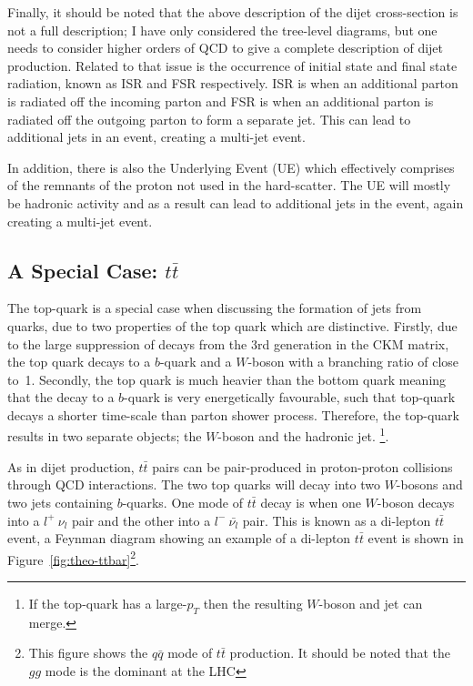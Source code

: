 Finally, it should be noted that the above description of the dijet cross-section is
not a full description; I have only considered the tree-level diagrams, 
but one needs to consider higher orders of QCD to give a complete description of dijet production.
Related to that issue is the occurrence of initial state and final state radiation, known as ISR and FSR respectively.
ISR is when an additional parton is radiated off the incoming parton and FSR is when an additional parton is radiated off the outgoing parton to form a separate jet.
This can lead to additional jets in an event, creating a multi-jet event.

In addition, there is also the Underlying Event (UE) which effectively comprises of the remnants of the proton not used in the hard-scatter.
The UE will mostly be hadronic activity and as a result can lead to additional jets in the event, again creating a multi-jet event.

\subsection{A Special Case: $t\bar{t}$}
\label{sec:theo-ttbar}

The top-quark is a special case when discussing the formation of jets from quarks,
due to two properties of the top quark which are distinctive.
Firstly, due to the large suppression of decays from the 3rd generation in the CKM matrix,
the top quark decays to a $b$-quark and a $W$-boson with a branching ratio of close to~1.
Secondly, the top quark is much heavier than the bottom quark
meaning that the decay to a $b$-quark is very energetically favourable,
such that top-quark decays a shorter time-scale than parton shower process.
Therefore, the top-quark results in two separate objects; the $W$-boson and the hadronic jet.
\footnote{If the top-quark has a large-$p_T$ then the resulting $W$-boson and jet can merge.}.

As in dijet production, $t\bar{t}$ pairs can be pair-produced in proton-proton collisions through QCD interactions.
The two top quarks will decay into two $W$-bosons and two jets containing $b$-quarks.
One mode of $t\bar{t}$ decay is when one $W$-boson decays into a $l^+~\nu_l$ pair and the other into a $l^{-}~\bar{\nu_l}$ pair.
This is known as a di-lepton $t\bar{t}$ event, a Feynman diagram showing an example of a di-lepton $t\bar{t}$ event is shown in
Figure~\ref{fig:theo-ttbar}\footnote{This figure shows the $q\bar{q}$ mode of $t\bar{t}$ production. It should be noted that the $gg$ mode is the dominant at the LHC}.

